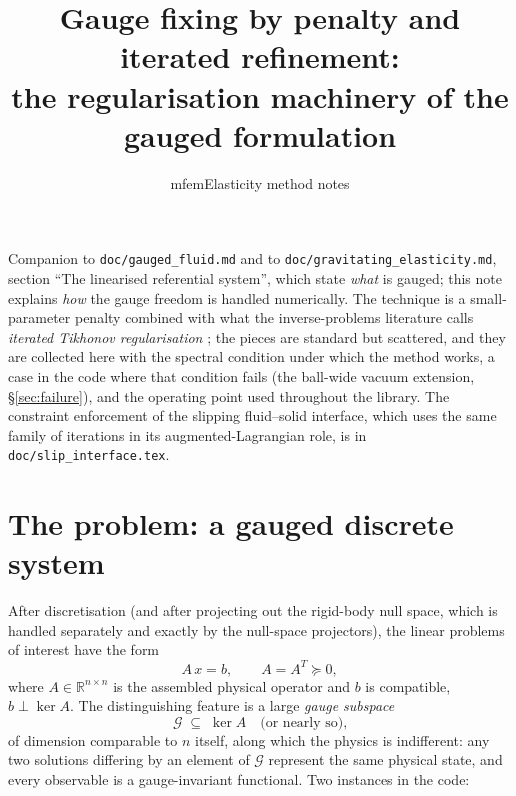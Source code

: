 \documentclass[11pt]{article}
\title{Gauge fixing by penalty and iterated refinement:\\
       the regularisation machinery of the gauged formulation}
\author{mfemElasticity method notes}
\date{}
\newcommand{\R}{\mathbb{R}}
\begin{document}
\maketitle

\noindent
Companion to \texttt{doc/gauged\_fluid.md} and to
\texttt{doc/gravitating\_elasticity.md}, section ``The linearised
referential system'', which state \emph{what} is gauged; this note
explains \emph{how} the gauge freedom is handled numerically. The
technique is a small-parameter penalty combined with what the
inverse-problems literature calls \emph{iterated Tikhonov
regularisation} \cite{Lardy1975,EnglHankeNeubauer}; the pieces are
standard but scattered, and they are collected here with the spectral
condition under which the method works, a case in the code where that
condition fails (the ball-wide vacuum extension, \S\ref{sec:failure}),
and the operating point used throughout the library. The constraint
enforcement of the slipping fluid--solid interface, which uses the same
family of iterations in its augmented-Lagrangian role, is in
\texttt{doc/slip\_interface.tex}.

\section{The problem: a gauged discrete system}

After discretisation (and after projecting out the rigid-body null
space, which is handled separately and exactly by the null-space
projectors), the linear problems of interest have the form
\begin{equation}
  A\,x = b, \qquad A = A^{T} \succeq 0,
  \label{eq:system}
\end{equation}
where $A \in \R^{n\times n}$ is the assembled physical operator and $b$
is compatible, $b \perp \ker A$. The distinguishing feature is a large
\emph{gauge subspace}
\[
  \mathcal{G} \;\subseteq\; \ker A
  \quad\text{(or nearly so),}
\]
of dimension comparable to $n$ itself, along which the physics is
indifferent: any two solutions differing by an element of $\mathcal{G}$
represent the same physical state, and every observable is a
gauge-invariant functional. Two instances in the code:
\end{document}
